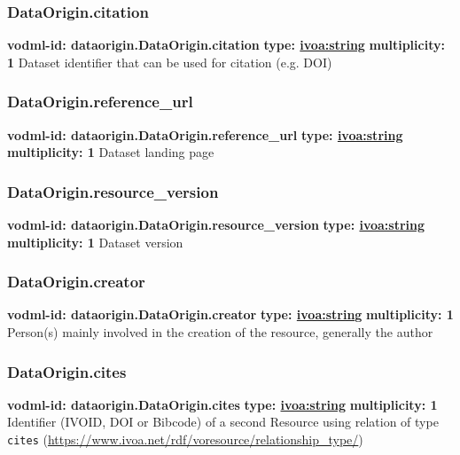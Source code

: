     \subsubsection{DataOrigin.citation}
    \textbf{vodml-id: dataorigin.DataOrigin.citation} \newline
    \textbf{type: \hyperref[sect:ivoa]{ivoa:string}} \newline
    \textbf{multiplicity: 1} \newline
    Dataset identifier that can be used for citation (e.g. DOI)

    \subsubsection{DataOrigin.reference\_url}
    \textbf{vodml-id: dataorigin.DataOrigin.reference\_url} \newline
    \textbf{type: \hyperref[sect:ivoa]{ivoa:string}} \newline
    \textbf{multiplicity: 1} \newline
    Dataset landing page

    \subsubsection{DataOrigin.resource\_version}
    \textbf{vodml-id: dataorigin.DataOrigin.resource\_version} \newline
    \textbf{type: \hyperref[sect:ivoa]{ivoa:string}} \newline
    \textbf{multiplicity: 1} \newline
    Dataset version

    \subsubsection{DataOrigin.creator}
    \textbf{vodml-id: dataorigin.DataOrigin.creator} \newline
    \textbf{type: \hyperref[sect:ivoa]{ivoa:string}} \newline
    \textbf{multiplicity: 1} \newline
    Person(s) mainly involved in the creation of the resource, generally the author

    \subsubsection{DataOrigin.cites}
    \textbf{vodml-id: dataorigin.DataOrigin.cites} \newline
    \textbf{type: \hyperref[sect:ivoa]{ivoa:string}} \newline
    \textbf{multiplicity: 1} \newline
    Identifier (IVOID, DOI or Bibcode) of a second Resource using relation of type \texttt{cites} (\url{https://www.ivoa.net/rdf/voresource/relationship\_type/})

